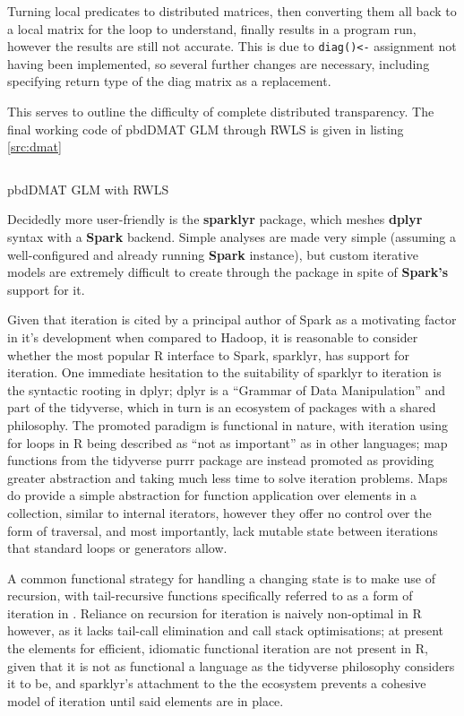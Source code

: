 Turning local predicates to distributed matrices, then converting them all back to a local matrix for the loop to understand, finally results in a program run, however the results are still not accurate.  
This is due to \texttt{diag()<-} assignment not having been implemented, so several further changes are necessary, including specifying return type of the diag matrix as a replacement.

This serves to outline the difficulty of complete distributed transparency. 
The final working code of pbdDMAT GLM through RWLS is given in listing \ref{src:dmat}

\begin{listing}
\inputminted{r}{R/review-pbdr.R}
        \caption{pbdDMAT GLM with RWLS}
        \label{src:dmat}
\end{listing}

Decidedly more user-friendly is the \textbf{sparklyr} package, which meshes \textbf{dplyr} syntax with a \textbf{Spark} backend.
Simple analyses are made very simple (assuming a well-configured and already running \textbf{Spark} instance), but custom iterative models are extremely difficult to create through the package in spite of \textbf{Spark's} support for it. 

Given that iteration is cited by a principal author of Spark as a motivating factor in it's development when compared to Hadoop, it is reasonable to consider whether the most popular R interface to Spark, sparklyr, has support for iteration\cite{zaharia2010spark}\cite{luraschi20}.
One immediate hesitation to the suitability of sparklyr to iteration is the syntactic rooting in dplyr; dplyr is a ``Grammar of Data Manipulation'' and part of the tidyverse, which in turn is an ecosystem of packages with a shared philosophy\cite{wickham2019welcome}\cite{wickham2016r}.
The promoted paradigm is functional in nature, with iteration using for loops in R being described as ``not as important'' as in other languages; map functions from the tidyverse purrr package are instead promoted as providing greater abstraction and taking much less time to solve iteration problems.
Maps do provide a simple abstraction for function application over elements in a collection, similar to internal iterators, however they offer no control over the form of traversal, and most importantly, lack mutable state between iterations that standard loops or generators allow\cite{cousineau1998functional}.

A common functional strategy for handling a changing state is to make use of recursion, with tail-recursive functions specifically referred to as a form of iteration in \citeauthor{abelson1996structure}.
Reliance on recursion for iteration is naively non-optimal in R however, as it lacks tail-call elimination and call stack optimisations\cite{rcore2020lang}; at present the elements for efficient, idiomatic functional iteration are not present in R, given that it is not as functional a language as the tidyverse philosophy considers it to be, and sparklyr's attachment to the the ecosystem prevents a cohesive model of iteration until said elements are in place.

